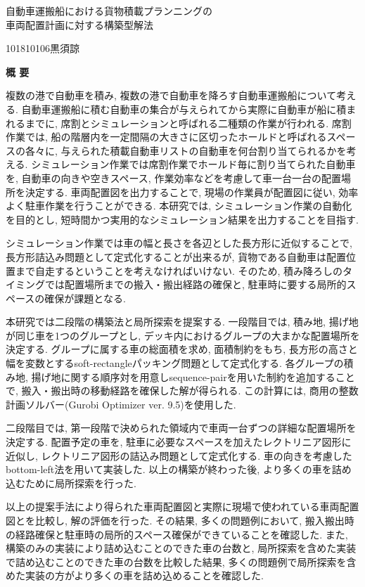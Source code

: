 \begin{center}
\begin{spacing}{1.3}
    {\LARGE 自動車運搬船における貨物積載プランニングの\\車両配置計画に対する構築型解法}\\[0.5cm]
\end{spacing}
\end{center}
\hfill
{\large 101810106\qquad 黒須諒}\\[0.5cm]
\begin{center}
{\Large \bf 概 要}\\
\end{center}

複数の港で自動車を積み, 複数の港で自動車を降ろす自動車運搬船について考える. 
自動車運搬船に積む自動車の集合が与えられてから実際に自動車が船に積まれるまでに, 席割とシミュレーションと呼ばれる二種類の作業が行われる. 
席割作業では, 船の階層内を一定間隔の大きさに区切ったホールドと呼ばれるスペースの各々に, 与えられた積載自動車リストの自動車を何台割り当てられるかを考える. 
シミュレーション作業では席割作業でホールド毎に割り当てられた自動車を, 自動車の向きや空きスペース, 作業効率などを考慮して車一台一台の配置場所を決定する. 
車両配置図を出力することで, 現場の作業員が配置図に従い, 効率よく駐車作業を行うことができる. 
本研究では, シミュレーション作業の自動化を目的とし, 短時間かつ実用的なシミュレーション結果を出力することを目指す. 

シミュレーション作業では車の幅と長さを各辺とした長方形に近似することで, 長方形詰込み問題として定式化することが出来るが, 貨物である自動車は配置位置まで自走するということを考えなければいけない. 
そのため, 積み降ろしのタイミングでは配置場所までの搬入・搬出経路の確保と, 駐車時に要する局所的スペースの確保が課題となる. 

本研究では二段階の構築法と局所探索を提案する. 
一段階目では, 積み地, 揚げ地が同じ車を1つのグループとし, デッキ内におけるグループの大まかな配置場所を決定する. 
グループに属する車の総面積を求め, 面積制約をもち, 長方形の高さと幅を変数とするsoft-rectangleパッキング問題として定式化する. 
各グループの積み地, 揚げ地に関する順序対を用意しsequence-pairを用いた制約を追加することで, 搬入・搬出時の移動経路を確保した解が得られる. 
この計算には, 商用の整数計画ソルバー(Gurobi Optimizer ver. 9.5)を使用した.  

二段階目では, 第一段階で決められた領域内で車両一台ずつの詳細な配置場所を決定する. 
配置予定の車を, 駐車に必要なスペースを加えたレクトリニア図形に近似し, レクトリニア図形の詰込み問題として定式化する. 
車の向きを考慮したbottom-left法を用いて実装した. 
以上の構築が終わった後, より多くの車を詰め込むために局所探索を行った.  

以上の提案手法により得られた車両配置図と実際に現場で使われている車両配置図とを比較し, 解の評価を行った. 
その結果, 多くの問題例において, 搬入搬出時の経路確保と駐車時の局所的スペース確保ができていることを確認した. 
また, 構築のみの実装により詰め込むことのできた車の台数と, 局所探索を含めた実装で詰め込むことのできた車の台数を比較した結果, 多くの問題例で局所探索を含めた実装の方がより多くの車を詰め込めることを確認した. 
